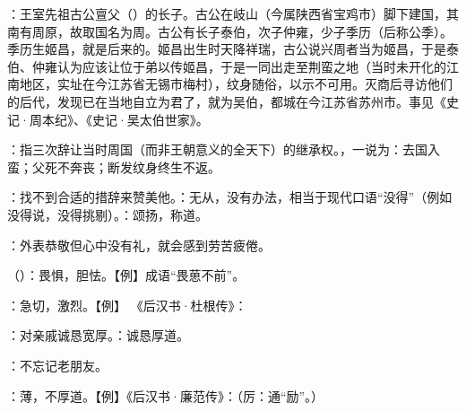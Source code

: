 {
\item {}：王室先祖古公亶父（）的长子。古公在岐山（今属陕西省宝鸡市）脚下建国，其南有周原，故取国名为周。古公有长子泰伯，次子仲雍，少子季历（后称公季）。季历生姬昌，就是后来的。姬昌出生时天降祥瑞，古公说兴周者当为姬昌，于是泰伯、仲雍认为应该让位于弟以传姬昌，于是一同出走至荆蛮之地（当时未开化的江南地区，实址在今江苏省无锡市梅村），纹身随俗，以示不可用。灭商后寻访他们的后代，发现已在当地自立为君了，就为吴伯，都城在今江苏省苏州市。事见《史记·周本纪》、《史记·吴太伯世家》。%
\item {}：指三次辞让当时周国（而非王朝意义的全天下）的继承权。，一说为：去国入蛮；父死不奔丧；断发纹身终生不返。 %
\item {}：找不到合适的措辞来赞美他。：无从，没有办法，相当于现代口语“没得”（例如没得说，没得挑剔）。：颂扬，称道。
}
{}


{
\item {}：外表恭敬但心中没有礼，就会感到劳苦疲倦。
\item {}（）：畏惧，胆怯。【例】成语“畏葸不前”。
\item {}：急切，激烈。【例】 《后汉书·杜根传》：
\item {}：对亲戚诚恳宽厚。：诚恳厚道。
\item {}：不忘记老朋友。
\item {}：薄，不厚道。【例】《后汉书·廉范传》：（厉：通“励”。）
}
{}



